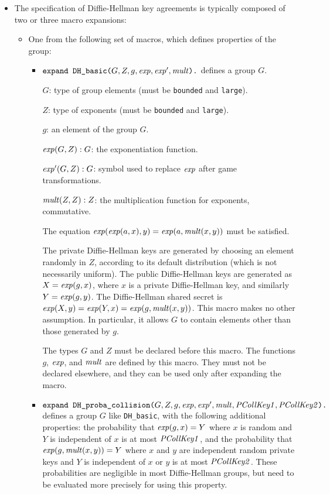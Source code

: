 \documentclass{article}
\begin{document}
\begin{itemize}
 \item The specification of Diffie-Hellman key agreements is typically composed of two or three macro expansions:

   \begin{itemize}
   \item One from the following set of macros, which defines properties of the group:
     \begin{itemize}
     \item $\texttt{expand\ DH\_basic(}G, Z, g, \mathit{exp}, \mathit{exp}', \mathit{mult}\texttt{).}$ defines a group $G$.

       $G$: type of group elements (must be \texttt{bounded} and \texttt{large}).

       $Z$: type of exponents (must be \texttt{bounded} and
       \texttt{large}). 
       
       $g$: an element of the group $G$.

       $\mathit{exp}(G, Z): G$: the exponentiation function.  
       
       $\mathit{exp}'(G, Z): G$: symbol used to replace $\mathit{exp}$ after game transformations.

       $\mathit{mult}(Z, Z): Z$: the multiplication function for exponents, commutative.

       The equation $\mathit{exp}(\mathit{exp}(a,x), y) = \mathit{exp}(a,
       \mathit{mult}(x,y))$ must be satisfied.

       The private Diffie-Hellman keys are generated by choosing an
       element randomly in $Z$, according to its default distribution
       (which is not necessarily uniform). The public Diffie-Hellman
       keys are generated as $X = \mathit{exp}(g,x)$, where $x$ is a
       private Diffie-Hellman key, and similarly $Y =
       \mathit{exp}(g,y)$. The Diffie-Hellman shared secret is
       $\mathit{exp}(X,y) = \mathit{exp}(Y,x) = \mathit{exp}(g,\mathit{mult}(x,y))$.
       This macro makes no other assumption. In particular, it allows
       $G$ to contain elements other than those generated by $g$.

       The types $G$ and $Z$ must be declared before this macro.  The
       functions $g$, $\mathit{exp}$, and $\mathit{mult}$ are defined by this
       macro. They must not be declared elsewhere, and they can be used
       only after expanding the macro.

     \item $\texttt{expand\ DH\_proba\_collision(}G, Z, g, \vn{exp},
       \vn{exp}', \vn{mult}, \vn{PCollKey1},
       \vn{PCollKey2}\texttt{).}$ defines a group $G$ like
       \texttt{DH\_basic}, with the following additional properties:
       the probability that $\mathit{exp}(g, x) = Y$ where $x$ is random and
       $Y$ is independent of $x$ is at most $\mathit{PCollKey1}$, and
       the probability that $\mathit{exp}(g, \mathit{mult}(x,y)) = Y$ where
       $x$ and $y$ are independent random private keys and 
       $Y$ is independent of $x$ or $y$ is at most
       $\mathit{PCollKey2}$. These probabilities are negligible in most
       Diffie-Hellman groups, but need to be evaluated more precisely
       for using this property.
       

\end{itemize}
\end{itemize}
\end{itemize}
\end{document}
